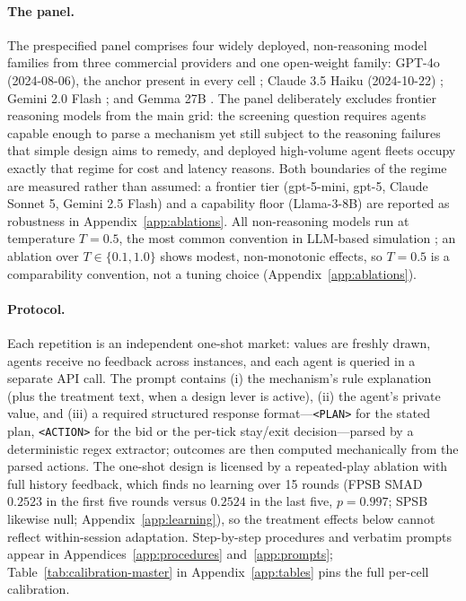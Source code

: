 \paragraph{The panel.}
The prespecified panel comprises four widely deployed, non-reasoning model families from three commercial providers and one open-weight family: GPT-4o (2024-08-06), the anchor present in every cell \citep{openai2024gpt4o}; Claude 3.5 Haiku (2024-10-22) \citep{anthropic2024claude}; Gemini 2.0 Flash \citep{google2024gemini}; and Gemma 27B \citep{google2024gemma}. The panel deliberately excludes frontier reasoning models from the main grid: the screening question requires agents capable enough to parse a mechanism yet still subject to the reasoning failures that simple design aims to remedy, and deployed high-volume agent fleets occupy exactly that regime for cost and latency reasons. Both boundaries of the regime are measured rather than assumed: a frontier tier (gpt-5-mini, gpt-5, Claude Sonnet 5, Gemini 2.5 Flash) and a capability floor (Llama-3-8B) are reported as robustness in Appendix~\ref{app:ablations}. All non-reasoning models run at temperature $T=0.5$, the most common convention in LLM-based simulation \citep{horton2023large, Horton2024EDSL}; an ablation over $T \in \{0.1, 1.0\}$ shows modest, non-monotonic effects, so $T=0.5$ is a comparability convention, not a tuning choice (Appendix~\ref{app:ablations}).

\paragraph{Protocol.}
Each repetition is an independent one-shot market: values are freshly drawn, agents receive no feedback across instances, and each agent is queried in a separate API call. The prompt contains (i) the mechanism's rule explanation (plus the treatment text, when a design lever is active), (ii) the agent's private value, and (iii) a required structured response format---\texttt{<PLAN>} for the stated plan, \texttt{<ACTION>} for the bid or the per-tick stay/exit decision---parsed by a deterministic regex extractor; outcomes are then computed mechanically from the parsed actions. The one-shot design is licensed by a repeated-play ablation with full history feedback, which finds no learning over 15 rounds (FPSB SMAD $0.2523$ in the first five rounds versus $0.2524$ in the last five, $p = 0.997$; SPSB likewise null; Appendix~\ref{app:learning}), so the treatment effects below cannot reflect within-session adaptation. Step-by-step procedures and verbatim prompts appear in Appendices~\ref{app:procedures} and~\ref{app:prompts}; Table~\ref{tab:calibration-master} in Appendix~\ref{app:tables} pins the full per-cell calibration.


